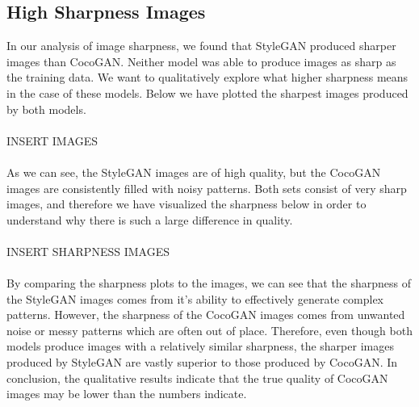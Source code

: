 \documentclass[12pt]{article}
\begin{document}
\begin{multicols*}{2}
        \subsection{High Sharpness Images}
        In our analysis of image sharpness, we found that StyleGAN produced sharper images than CocoGAN.
        Neither model was able to produce images as sharp as the training data.
        We want to qualitatively explore what higher sharpness means in the case of these models.
        Below we have plotted the sharpest images produced by both models.
        \\\\
        INSERT IMAGES
        \\\\
        As we can see, the StyleGAN images are of high quality, but the CocoGAN images are consistently filled with noisy patterns.
        Both sets consist of very sharp images, and therefore we have visualized the sharpness below in order to understand why there is such a large difference in quality.
        \\\\
        INSERT SHARPNESS IMAGES
        \\\\
        By comparing the sharpness plots to the images, we can see that the sharpness of the StyleGAN images comes from it's ability to effectively generate complex patterns.
        However, the sharpness of the CocoGAN images comes from unwanted noise or messy patterns which are often out of place.
        Therefore, even though both models produce images with a relatively similar sharpness, the sharper images produced by StyleGAN are vastly superior to those produced by CocoGAN.
        In conclusion, the qualitative results indicate that the true quality of CocoGAN images may be lower than the numbers indicate.
    \end{multicols*}
\end{document}
